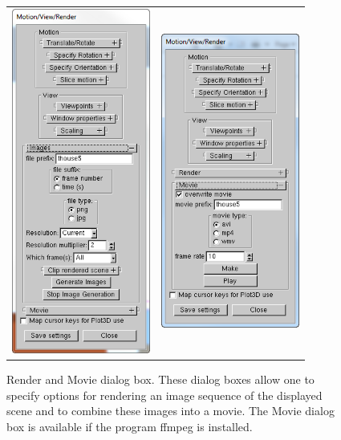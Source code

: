 \documentclass[11pt,twoside]{book}
\begin{document}
\begin{figure}[bph]
\begin{center}
\begin{tabular}{cc}
\includegraphics[width=1.7916666in]{FIGURES/figIMAGES}&
\includegraphics[width=1.7916666in]{FIGURES/figMOVIE}
\end{tabular}
\end{center}
\caption[Render and Movie dialog box.]{Render and Movie dialog box. These dialog boxes allow one to specify
options for rendering an image sequence of the displayed scene and to combine these images into a movie.  The Movie dialog box is available if the program ffmpeg is installed.}
\label{figRENDER}
\end{figure}
\end{document}

